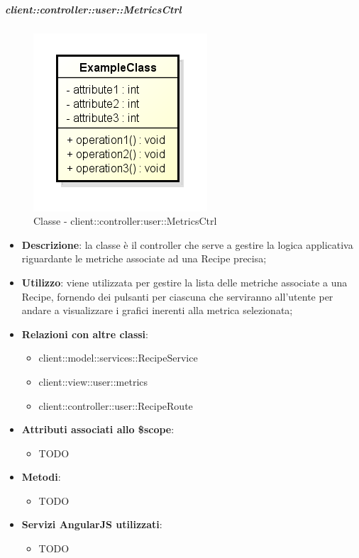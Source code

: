 		\subparagraph{client::controller::user::MetricsCtrl} %
		\label{subp:client_controller_user_metricsctrl}
			\begin{figure}[htbp]
				\centering
				\centerline{\includegraphics[scale=0.7]{./images/client/classes/example_class.png}}
				\caption{Classe - client::controller:user::MetricsCtrl}
			\end{figure}
			\begin{itemize}
				\item \textbf{Descrizione}: la classe è il controller che serve a gestire la logica applicativa riguardante le metriche associate ad una Recipe precisa;
				\item \textbf{Utilizzo}: viene utilizzata per gestire la lista delle metriche associate a una Recipe, fornendo dei pulsanti per ciascuna che serviranno all'utente per andare a visualizzare i grafici inerenti alla metrica selezionata;
				\item \textbf{Relazioni con altre classi}:
					\begin{itemize}
						\item client::model::services::RecipeService
						\item client::view::user::metrics
						\item client::controller::user::RecipeRoute
					\end{itemize}

				\item \textbf{Attributi associati allo \$scope}:
					\begin{itemize}
						\item TODO
					\end{itemize}

				\item \textbf{Metodi}:
					\begin{itemize}
						\item TODO
					\end{itemize}

				\item \textbf{Servizi AngularJS utilizzati}:
					\begin{itemize}
						\item TODO
					\end{itemize}

			\end{itemize}

